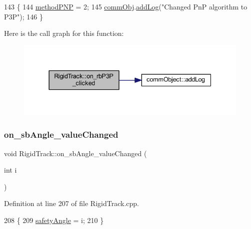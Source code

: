 \begin{DoxyCode}
143 \{
144     \hyperlink{main_8cpp_ab5e634b66221f494504aea1557af5df9}{methodPNP} = 2;
145     \hyperlink{main_8cpp_af29e7fc07ae0979d5fb61b473241d33d}{commObj}.\hyperlink{classcomm_object_aec354c7099b3039083cc4224e071e022}{addLog}(\textcolor{stringliteral}{"Changed PnP algorithm to P3P"});
146 \}
\end{DoxyCode}
Here is the call graph for this function\+:
\nopagebreak
\begin{figure}[H]
\begin{center}
\leavevmode
\includegraphics[width=337pt]{class_rigid_track_ac1f10ea5ec3f718c152e245a04776454_cgraph}
\end{center}
\end{figure}
\mbox{\label{class_rigid_track_a217ca3d828c99943ea155e6891264b24}} 
\subsubsection{\texorpdfstring{on\+\_\+sb\+Angle\+\_\+value\+Changed}{on\_sbAngle\_valueChanged}}
{\footnotesize\ttfamily void Rigid\+Track\+::on\+\_\+sb\+Angle\+\_\+value\+Changed (\begin{DoxyParamCaption}\item[{int}]{i }\end{DoxyParamCaption})\hspace{0.3cm}{\ttfamily [slot]}}



Definition at line 207 of file Rigid\+Track.\+cpp.


\begin{DoxyCode}
208 \{
209     \hyperlink{main_8cpp_ae65386c3310ab826e84fba757296de9a}{safetyAngle} = i;
210 \}
\end{DoxyCode}
\mbox{\label{class_rigid_track_a72e338d6bf93d0efa3bc503f7ca736c5}} 
